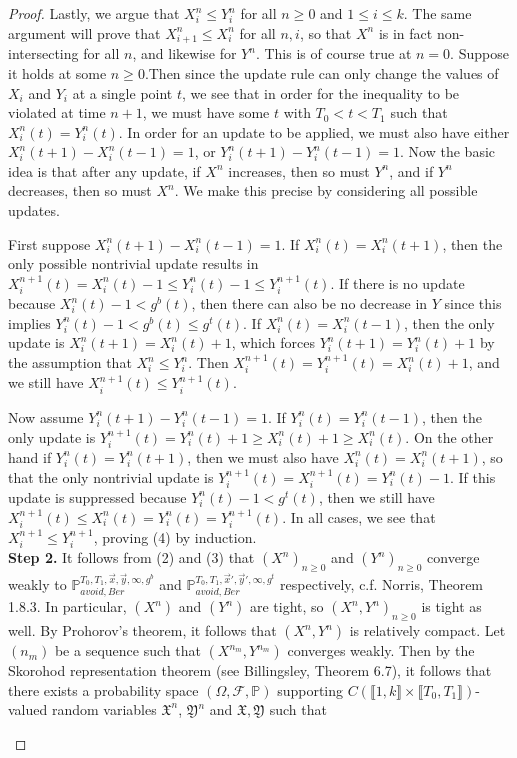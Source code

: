 \documentclass[12pt]{article}
\begin{document}
\begin{proof}
	Lastly, we argue that $X^n_i\leq Y^n_i$ for all $n\geq 0$ and $1\leq i\leq k$. The same argument will prove that $X^n_{i+1}\leq X^n_i$ for all $n,i$, so that $X^n$ is in fact non-intersecting for all $n$, and likewise for $Y^n$. This is of course true at $n=0$. Suppose it holds at some $n\geq 0$.Then since the update rule can only change the values of $X_i$ and $Y_i$ at a single point $t$, we see that in order for the inequality to be violated at time $n+1$, we must have some $t$ with $T_0 < t < T_1$ such that $X^n_i(t)=Y^n_i(t)$. In order for an update to be applied, we must also have either $X^n_i(t+1) - X^n_i(t-1) = 1$, or $Y^n_i(t+1) - Y^n_i(t-1) = 1$. Now the basic idea is that after any update, if $X^n$ increases, then so must $Y^n$, and if $Y^n$ decreases, then so must $X^n$. We make this precise by considering all possible updates.
	
	First suppose $X^n_i(t+1) - X^n_i(t-1) = 1$. If $X^n_i(t) = X^n_i(t+1)$, then the only possible nontrivial update results in $X^{n+1}_i(t) = X^n_i(t) - 1 \leq Y^n_i(t) - 1 \leq Y^{n+1}_i(t)$. If there is no update because $X^n_i(t)-1 < g^b(t)$, then there can also be no decrease in $Y$ since this implies $Y^n_i(t)-1 < g^b(t) \leq g^t(t)$. If $X^n_i(t) = X^n_i(t-1)$, then the only update is $X^n_i(t+1) = X^n_i(t)+1$, which forces $Y^n_i(t+1) = Y^n_i(t)+1$ by the assumption that $X^n_i\leq Y^n_i$. Then $X^{n+1}_i(t) = Y^{n+1}_i(t) = X^n_i(t) + 1$, and we still have $X^{n+1}_i(t)\leq Y^{n+1}_i(t)$. 
	
	Now assume $Y^n_i(t+1)-Y^n_i(t-1) = 1$. If $Y^n_i(t) = Y^n_i(t-1)$, then the only update is $Y^{n+1}_i(t) = Y^n_i(t) + 1 \geq X^n_i(t) + 1 \geq X^n_i(t)$. On the other hand if $Y^n_i(t) = Y^n_i(t+1)$, then we must also have $X^n_i(t) = X^n_i(t+1)$, so that the only nontrivial update is $Y^{n+1}_i(t) = X^{n+1}_i(t) = Y^n_i(t) - 1$. If this update is suppressed because $Y^n_i(t)-1 < g^t(t)$, then we still have $X^{n+1}_i(t) \leq X^n_i(t) = Y^n_i(t) = Y^{n+1}_i(t)$. In all cases, we see that $X^{n+1}_i\leq Y^{n+1}_i$, proving (4) by induction.\\
	
	\textbf{Step 2.} It follows from (2) and (3) that $(X^n)_{n\geq 0}$ and $(Y^n)_{n\geq 0}$ converge weakly to $\mathbb{P}_{avoid,Ber}^{T_0,T_1,\vec{x},\vec{y},\infty,g^b}$ and $\mathbb{P}_{avoid,Ber}^{T_0,T_1,\vec{x}',\vec{y}',\infty,g^t}$ respectively, c.f. Norris, Theorem 1.8.3. In particular, $(X^n)$ and $(Y^n)$ are tight, so $(X^n,Y^n)_{n\geq 0}$ is tight as well. By Prohorov's theorem, it follows that $(X^n,Y^n)$ is relatively compact. Let $(n_m)$ be a sequence such that $(X^{n_m},Y^{n_m})$ converges weakly. Then by the Skorohod representation theorem (see Billingsley, Theorem 6.7), it follows that there exists a probability space $(\Omega,\mathcal{F},\mathbb{P})$ supporting $C(\llbracket 1, k\rrbracket \times \llbracket T_0, T_1\rrbracket)$-valued random variables $\mathfrak{X}^n$, $\mathfrak{Y}^n$ and $\mathfrak{X},\mathfrak{Y}$ such that
	\begin{enumerate}[label=(\arabic*)]
		

\end{enumerate}
\end{proof}
\end{document}
